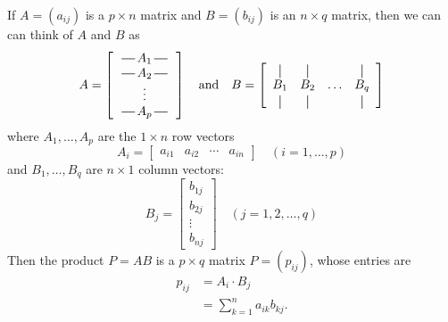 \documentclass[10pt]{article}
\theoremstyle{definition}
\begin{document}
\begin{tcolorbox}[colframe=black, colback=gray!5, arc=2mm, boxrule=0.8pt,
  breakable, title=Matrix Multiplication,   coltitle=black,colbacktitle=black!10]
  If $A=(a_{ij})$ is a $p\times n$ matrix and $B=(b_{ij})$ is an $n\times q$
  matrix, then we can can think of $A$ and $B$ as
  \newcommand*{\vertbar}{\rule[-1ex]{0.5pt}{2.5ex}}
  \newcommand*{\horzbar}{\,\rule[.5ex]{2.5ex}{0.5pt}\,}
  \begin{equation*}
    A =
    \left[\begin{array}{c}
        \horzbar  A_{1}  \horzbar \\
        \horzbar  A_{2}  \horzbar \\
        \vdots             \\
        \horzbar  A_{p} \horzbar
      \end{array}\right]
    \quad \text{and} \quad
    B = 
    \left[
      \begin{array}{cccc}
        \vertbar & \vertbar &        & \vertbar \\
        B_{1}    & B_{2}    & \ldots & B_{q}    \\
        \vertbar & \vertbar &        & \vertbar 
      \end{array}
    \right]
  \end{equation*}
  where $A_{1},\ldots,A_{p}$ are the $1\times n$ row vectors
  \begin{equation*}
    A_{i} =
    \begin{bmatrix}
      a_{i1}& a_{i2}& \cdots & a_{in}
    \end{bmatrix}
    \quad (i=1,\ldots,p)
  \end{equation*}
  and $B_{1},\ldots,B_{q}$ are $n\times 1$ column vectors:
  \begin{equation*}
    B_{j} =
    \begin{bmatrix}
      b_{1j}\\b_{2j}\\\vdots\\b_{nj}
    \end{bmatrix}
    \quad (j=1,2,\ldots,q)
  \end{equation*}
Then the product $P=AB$ is a $p\times q$ matrix $P=(p_{ij})$, whose entries are
\begin{align*}
  p_{ij} 
  &= A_{i}\cdot B_{j} \\
  &= \sum_{k=1}^{n}a_{ik}b_{kj}.
\end{align*}
\end{tcolorbox}
\end{document}
